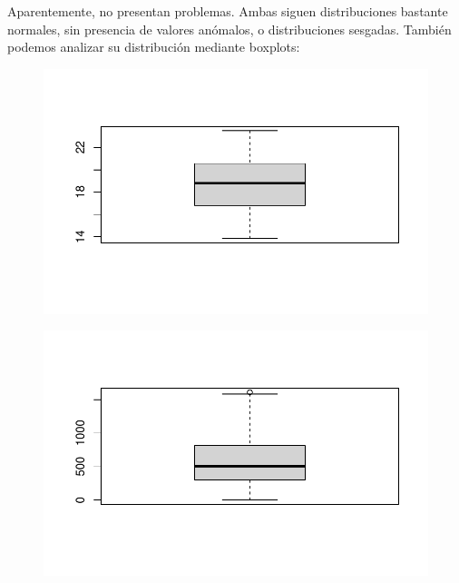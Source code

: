 \documentclass[
  letterpaper,
  DIV=11,
  numbers=noendperiod]{scrreprt}
\newenvironment{Shaded}{\begin{snugshade}}{\end{snugshade}}
\newcommand{\FunctionTok}[1]{\textcolor[rgb]{0.28,0.35,0.67}{#1}}
\newcommand{\NormalTok}[1]{\textcolor[rgb]{0.00,0.23,0.31}{#1}}
\newcommand{\SpecialCharTok}[1]{\textcolor[rgb]{0.37,0.37,0.37}{#1}}
\begin{document}
Aparentemente, no presentan problemas. Ambas siguen distribuciones
bastante normales, sin presencia de valores anómalos, o distribuciones
sesgadas. También podemos analizar su distribución mediante boxplots:

\begin{Shaded}
\end{Shaded}

\begin{figure}[H]

{\centering \includegraphics{01_RegresionLineal_files/figure-pdf/unnamed-chunk-5-1.pdf}

}

\end{figure}

\begin{Shaded}
\end{Shaded}

\begin{figure}[H]

{\centering \includegraphics{01_RegresionLineal_files/figure-pdf/unnamed-chunk-5-2.pdf}

}

\end{figure}
\end{document}
